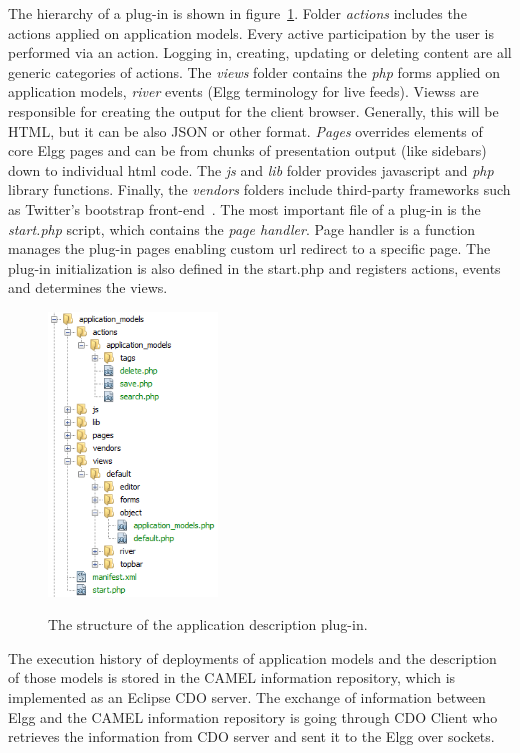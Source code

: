 The hierarchy of a plug-in is shown in figure~\ref{fig:elgg_hierarchy}. 
Folder {\em actions} includes the actions applied on application models. Every active participation by the user is performed via an action. Logging in, creating, updating or deleting content are all generic categories of actions.
The {\em views} folder contains the {\em php} forms applied on application models, {\em river} events (Elgg terminology for live feeds). Viewss are responsible for creating the output for the client browser. Generally, this will be HTML, but it can be also JSON or other format. 
{\em Pages} overrides elements of core Elgg pages and can be from chunks of presentation output (like sidebars) down to individual html code.  
The {\em js} and {\em lib} folder provides javascript and {\em php} library functions. 
Finally, the {\em vendors} folders include third-party frameworks such as Twitter's bootstrap front-end~\cite{bootstrap_url}.
The most important file of a plug-in is the \emph{start.php} script, which contains the \emph{page handler}. Page handler is a function manages the plug-in pages enabling custom url redirect to a specific page. 
The plug-in initialization is also defined in the start.php and registers actions, events and determines the views. 

\begin{figure}[h]
	\caption{The structure of the application description plug-in.}
	\includegraphics[width=0.4\textwidth]{./fig/folder_hierarchy.png}
	\centering
	\label{fig:elgg_hierarchy}
\end{figure}

The execution history of deployments of application models and the description of those models is stored in the CAMEL information repository, which is implemented as an Eclipse CDO server. The exchange of information between Elgg and the CAMEL information repository is going through CDO Client who retrieves the information from CDO server and sent it to the Elgg over sockets.

